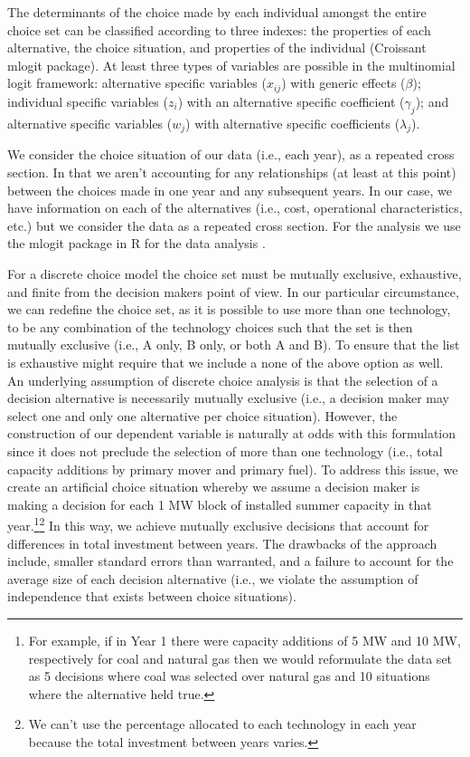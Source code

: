 \documentclass[10pt]{amsart}
\begin{document}
The determinants of the choice made by each individual amongst the entire choice set can be classified according to three indexes: the properties of each alternative, the choice situation, and properties of the individual \cite{}(Croissant mlogit package).
At least three types of variables are possible in the multinomial logit framework: alternative specific variables ($x_{ij}$) with generic effects ($\beta$); individual specific variables ($z_i$) with an alternative specific coefficient ($\gamma_j$); and alternative specific variables ($w_j$) with alternative specific coefficients ($\lambda_j$)\parencite{mlogit2013}.  

We consider the choice situation of our data (i.e., each year), as a repeated cross section. 
In that we aren't accounting for any relationships (at least at this point) between the choices made in one year and any subsequent years.  
In our case, we have information on each of the alternatives (i.e., cost, operational characteristics, etc.) but we consider the data as a repeated cross section. 
For the analysis we use the mlogit package in R for the data analysis \parencite{mlogit2013}. 
 
For a discrete choice model the choice set must be mutually exclusive, exhaustive, and finite from the decision makers point of view. In our particular circumstance, we can redefine the choice set, as it is possible to use more than one technology, to be any combination of the technology choices such that the set is then mutually exclusive (i.e., A only, B only, or both A and B). To ensure that the list is exhaustive might require that we include a none of the above option as well.
An underlying assumption of discrete choice analysis is that the selection of a decision alternative is necessarily mutually exclusive (i.e., a decision maker may select one and only one alternative per choice situation). 
However, the construction of our dependent variable is naturally at odds with this formulation since it does not preclude the selection of more than one technology (i.e., total capacity additions by primary mover and primary fuel).
To address this issue, we create an artificial choice situation whereby we assume a decision maker is making a decision for each 1 MW block of installed summer capacity in that year.\footnote{For example, if in Year 1 there were capacity additions of 5 MW and 10 MW, respectively for coal and natural gas then we would reformulate the data set as 5 decisions where coal was selected over natural gas and 10 situations where the alternative held true.}\footnote{We can't use the percentage allocated to each technology in each year because the total investment between years varies.} 
In this way, we achieve mutually exclusive decisions that account for differences in total investment between years.
The drawbacks of the approach include, smaller standard errors than warranted, and a failure to account for the average size of each decision alternative (i.e., we violate the assumption of independence that exists between choice situations).
\end{document}
